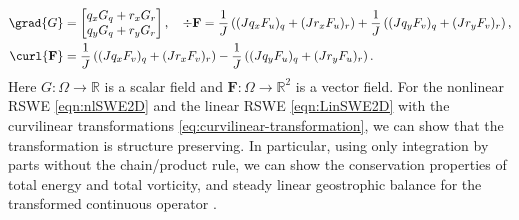 \documentclass{article}
\numberwithin{equation}{section}
\theoremstyle{definition}
\begin{document}
\begin{equation}\label{eq:curvilinear-transformation}
\begin{split}
    \grad{G} &= 
\begin{bmatrix}
    q_x G_q + r_xG_r\\
    q_y G_q + r_yG_r
\end{bmatrix},
\quad 
\div{\mathbf{F}}  = \frac{1}{J} \left((Jq_x F_u)_q + (Jr_xF_u)_r\right) +  \frac{1}{J} \left((Jq_y F_v)_q + (Jr_yF_v)_r\right),\\
\curl{\mathbf{F}}  &= \frac{1}{J} \left((Jq_x F_v)_q + (Jr_xF_v)_r\right) - \frac{1}{J} \left((Jq_y F_u)_q + (Jr_yF_u)_r\right).
\end{split}
\end{equation}
Here $G: \Omega \to \mathbb{R}$ is a scalar field and $\mathbf{F}: \Omega \to \mathbb{R}^2$ is a vector field.
For the nonlinear  RSWE \eqref{eqn:nlSWE2D} and the linear  RSWE \eqref{eqn:LinSWE2D} with the curvilinear transformations \eqref{eq:curvilinear-transformation}, we can show that the transformation is structure preserving. In particular, using only integration by parts without the chain/product rule, we can  show the  conservation properties of   total energy and total vorticity,  and steady linear geostrophic balance for the transformed continuous operator \cite{ricardo2023conservation}.
\end{document}
